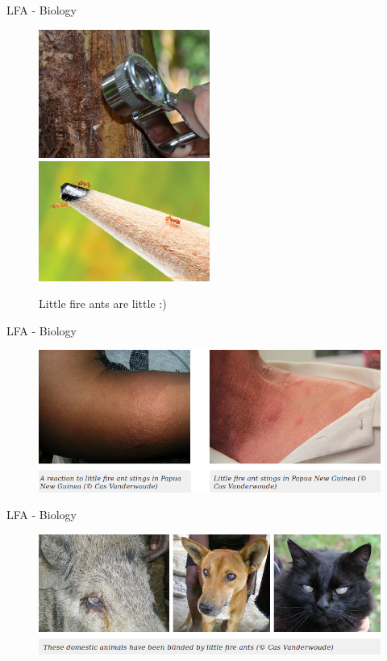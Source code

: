 \documentclass[]{beamer}
\begin{document}
\begin{frame}{LFA - Biology}
\begin{figure}
	\includegraphics[width=0.5\textwidth]{lfa2small.jpg}
	\includegraphics[width=0.5\textwidth]{lfa-pencil.jpg}
	\caption{Little fire ants are little :)}
\end{figure}
\end{frame}

\begin{frame}{LFA - Biology}
\begin{figure}
	\includegraphics[width=\textwidth]{lfa-stings.png}
\end{figure}
\end{frame}

\begin{frame}{LFA - Biology}
\begin{figure}
	\includegraphics[width=\textwidth]{lfa-eyes.png}
\end{figure}
\end{frame}
\end{document}
